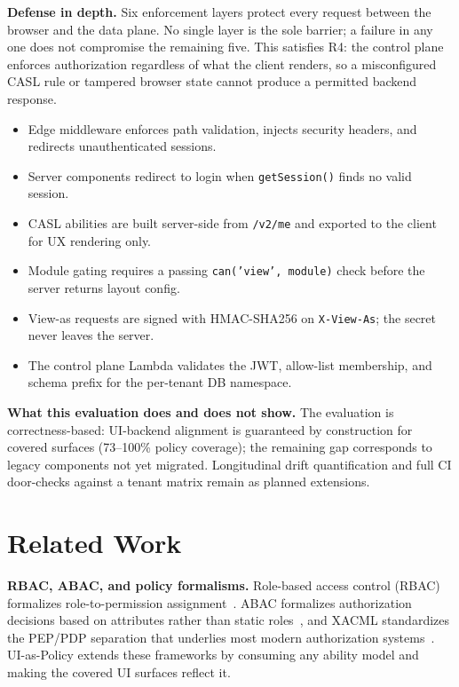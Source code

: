 \documentclass[10pt,journal]{IEEEtran}
\newcommand{\uiPolicy}{UI-as-Policy}
\newcommand{\code}[1]{{\small\textcolor{CausifyBlue}{\texttt{#1}}}}
\begin{document}
\noindent\textbf{Defense in depth.} Six enforcement layers protect every request between
the browser and the data plane. No single layer is the sole barrier; a failure
in any one does not compromise the remaining five. This satisfies R4: the
control plane enforces authorization regardless of what the client renders, so
a misconfigured CASL rule or tampered browser state cannot produce a permitted
backend response.
\begin{itemize}[label=\textbullet, leftmargin=1.2em, topsep=2pt, itemsep=1pt, parsep=0pt, partopsep=0pt]
  \item Edge middleware enforces path validation, injects security headers, and redirects unauthenticated sessions.
  \item Server components redirect to login when \code{getSession()} finds no valid session.
  \item CASL abilities are built server-side from \code{/v2/me} and exported to the client for UX rendering only.
  \item Module gating requires a passing \code{can('view',\,module)} check before the server returns layout config.
  \item View-as requests are signed with HMAC-SHA256 on \code{X-View-As}; the secret never leaves the server.
  \item The control plane Lambda validates the JWT, allow-list membership, and schema prefix for the per-tenant DB namespace.
\end{itemize}

\noindent\textbf{What this evaluation does and does not show.}
The evaluation is correctness-based: UI-backend alignment is guaranteed by
construction for covered surfaces (73--100\% policy coverage); the remaining
gap corresponds to legacy components not yet migrated. Longitudinal drift
quantification and full CI door-checks against a tenant matrix remain as
planned extensions.

\section{Related Work}

\noindent\textbf{RBAC, ABAC, and policy formalisms.}
Role-based access control (RBAC) formalizes role-to-permission assignment~\cite{sandhu_rbac}.
ABAC formalizes
authorization decisions based on attributes rather than static
roles~\cite{nist_abac}, and XACML standardizes the PEP/PDP separation
that underlies most modern authorization systems~\cite{xacml}.
\uiPolicy{} extends these frameworks by consuming any ability model and
making the covered UI surfaces reflect it.
\end{document}

